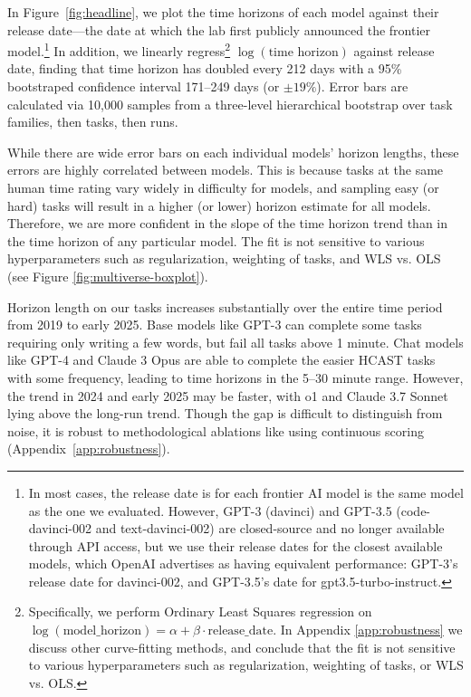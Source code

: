 \documentclass{article}
\newcommand{\gabenchmark}{HCAST}
\newcommand{\nbootstrap}{10,000}
\begin{document}
In Figure~\ref{fig:headline}, we plot the time horizons of each model against their release date---the date at which the lab first publicly announced the frontier model.\footnote{In most cases, the release date is for each frontier AI model is the same model as the one we evaluated. However, GPT-3 (davinci) and GPT-3.5 (code-davinci-002 and text-davinci-002) are closed-source and no longer available through API access, but we use their release dates for the closest available models, which OpenAI advertises as having equivalent performance: GPT-3's release date for davinci-002, and GPT-3.5's date for gpt3.5-turbo-instruct.} In addition, we linearly regress\footnote{Specifically, we perform Ordinary Least Squares regression on $\log(\text{model\_horizon}) = \alpha + \beta \cdot  \text{release\_date}$. In Appendix \ref{app:robustness} we discuss other curve-fitting methods, and conclude that the fit is not sensitive to various hyperparameters such as regularization, weighting of tasks, or WLS vs. OLS.} $\log(\text{time horizon})$ against release date, finding that time horizon has doubled every 212 days with a 95\% bootstraped confidence interval 171--249 days (or $\pm 19\%$). Error bars are calculated via \nbootstrap{} samples from a three-level hierarchical bootstrap over task families, then tasks, then runs. 

While there are wide error bars on each individual models' horizon lengths, these errors are highly correlated between models. This is because tasks at the same human time rating vary widely in difficulty for models, and sampling easy (or hard) tasks will result in a higher (or lower) horizon estimate for all models. Therefore, we are more confident in the slope of the time horizon trend than in the time horizon of any particular model. The fit is not sensitive to various hyperparameters such as regularization, weighting of tasks, and WLS vs. OLS (see Figure \ref{fig:multiverse-boxplot}). 

Horizon length on our tasks increases substantially over the entire time period from 2019 to early 2025. Base models like GPT-3 can complete some tasks requiring only writing a few words, but fail all tasks above 1 minute. Chat models like GPT-4 and Claude 3 Opus are able to complete the easier \gabenchmark{} tasks with some frequency, leading to time horizons in the 5--30 minute range. However, the trend in 2024 and early 2025 may be faster, with o1 and Claude 3.7 Sonnet lying above the long-run trend. Though the gap is difficult to distinguish from noise, it is robust to methodological ablations like using continuous scoring (Appendix~\ref{app:robustness}).
\end{document}
